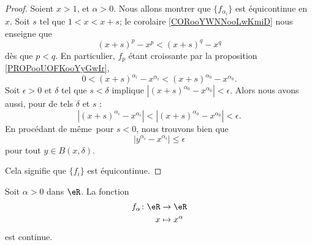 \begin{proof}
	Soient \( x>1\), et \( \alpha>0\). Nous allons montrer que \( \{ f_{\alpha_i} \}\) est équicontinue en \( x\). Soit \( s\) tel que \( 1<x<x+s\); le corolaire \ref{CORooYWNNooLwKmiD} nous enseigne que
	\begin{equation}
		(x+s)^p-x^p<(x+s)^q-x^q
	\end{equation}
	dès que \( p<q\). En particulier, \( f_p\) étant croissante par la proposition \ref{PROPooUOFKooYyGwIr},
	\begin{equation}
		0<(x+s)^{\alpha_i}-x^{\alpha_i}<(x+s)^{\alpha_0}-x^{\alpha_0}.
	\end{equation}
	Soit \( \epsilon>0\) et \( \delta\) tel que \( s<\delta\) implique \( | (x+s)^{\alpha_0}-x^{\alpha_0} |<\epsilon\). Alors nous avons aussi, pour de tels \( \delta\) et \( s\) :
	\begin{equation}
		|(x+s)^{\alpha_i}-x^{\alpha_i}|<|(x+s)^{\alpha_0}-x^{\alpha_0}|<\epsilon.
	\end{equation}
	En procédant de même\ pour \( s<0\), nous trouvons bien que
	\begin{equation}
		| y^{\alpha_i}-x^{\alpha_i} |\leq \epsilon
	\end{equation}
	pour tout \( y\in B(x,\delta)\).

	Cela signifie que \( \{ f_i \}\) est équicontinue.
\end{proof}


\begin{proposition}      \label{PROPooUQNZooSSHLqr}
	Soit \( \alpha>0\) dans \( \eR\). La fonction
	\begin{equation}
		\begin{aligned}
			f_{\alpha}\colon \eR & \to \eR            \\
			x                    & \mapsto x^{\alpha}
		\end{aligned}
	\end{equation}
    est continue.
\end{proposition}

